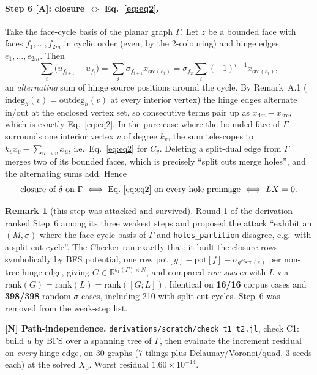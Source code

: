 \documentclass[11pt,a4paper]{article}
\theoremstyle{definition}
\newtheorem{remark}[theorem]{Remark}
\newcommand{\file}[1]{\texttt{\small #1}}
\begin{document}
\paragraph{Step 6 [A]: closure $\Leftrightarrow$ Eq.~\eqref{eq:eq2}.} Take the face-cycle
basis of the planar graph $\Gamma$. Let $z$ be a bounded face with faces
$f_1,\dots,f_{2m}$ in cyclic order (even, by the 2-colouring) and hinge edges
$e_1,\dots,e_{2m}$. Then
\[
\sum_i\bigl(u_{f_{i+1}}-u_{f_i}\bigr)
=\sum_i \sigma_{f_{i+1}}x_{\mathrm{src}(e_i)}
=\sigma_{f_2}\sum_i(-1)^{i-1}x_{\mathrm{src}(e_i)} ,
\]
an \emph{alternating} sum of hinge source positions around the cycle. By Remark~A.1
($\mathrm{indeg}_h(v)=\mathrm{outdeg}_h(v)$ at every interior vertex) the hinge edges
alternate in/out at the enclosed vertex set, so consecutive terms pair up as
$x_{\mathrm{dst}}-x_{\mathrm{src}}$, which is exactly Eq.~\eqref{eq:eq2}. In the pure case
where the bounded face of $\Gamma$ surrounds one interior vertex $v$ of degree $k_v$, the
sum telescopes to $k_vx_v-\sum_{u\to v}x_u$, i.e.\ Eq.~\eqref{eq:eq2} for
$C_v$. Deleting a split-dual edge from $\Gamma$ merges two of its bounded faces, which is
precisely ``split cuts merge holes'', and the alternating sums add. Hence
\begin{equation}
\text{closure of }\delta\text{ on }\Gamma
\;\Longleftrightarrow\;
\text{Eq.~\eqref{eq:eq2} on every hole preimage}
\;\Longleftrightarrow\;
LX=0 .
\end{equation}

\begin{remark}[this step was attacked and survived]
Round 1 of the derivation ranked Step~6 among its three weakest steps and proposed the
attack ``exhibit an $(M,\sigma)$ where the face-cycle basis of $\Gamma$ and
\file{holes\_partition} disagree, e.g.\ with a split-cut cycle''. The Checker ran exactly
that: it built the closure rows symbolically by BFS potential, one row
$\mathrm{pot}[g]-\mathrm{pot}[f]-\sigma_g e_{\mathrm{src}(e)}$ per non-tree hinge edge,
giving $G\in\mathbb{R}^{b_1(\Gamma)\times N}$, and compared \emph{row spaces} with $L$ via
$\mathrm{rank}(G)=\mathrm{rank}(L)=\mathrm{rank}([G;L])$. Identical on \textbf{16/16} corpus
cases and \textbf{398/398} random-$\sigma$ cases, including 210 with split-cut cycles.
Step~6 was removed from the weak-step list.
\end{remark}

\textbf{[N] Path-independence.} \file{derivations/scratch/check\_t1\_t2.jl}, check C1: build
$u$ by BFS over a spanning tree of $\Gamma$, then evaluate the increment residual on
\emph{every} hinge edge, on 30 graphs (7 tilings plus Delaunay/Voronoi/quad, 3 seeds each) at
the solved $X_0$. Worst residual $1.60\times10^{-14}$.
\end{document}
